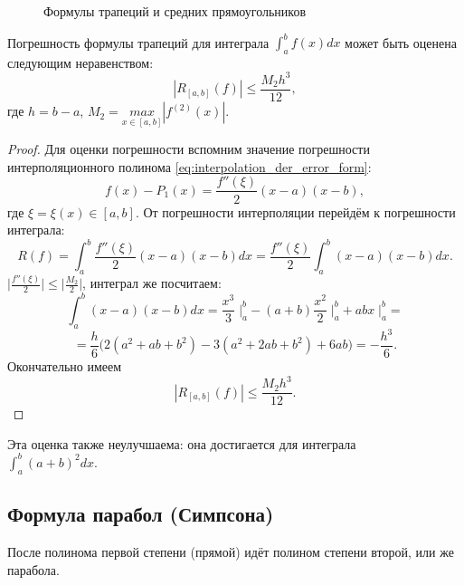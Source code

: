 \documentclass[../main.tex]{subfile}
\begin{document}
\begin{figure}[ht]
	\caption*{Формулы трапеций и средних прямоугольников}
\end{figure}

\begin{theorem}
\label{eq:trapezoidal_rule_error}
	Погрешность формулы трапеций для интеграла $\int_a^b f(x)dx$ может быть
	оценена следующим неравенством:
	\[\boxed{|R_{[a,b]}(f)|\le\frac{M_2h^3}{12}},\]
	где $h=b-a$, $M_2=\underset{x\in[a,b]}{max}|f^{(2)}(x)|.$
\end{theorem}

\begin{proof}
	Для оценки погрешности вспомним значение погрешности интерполяционного
	полинома \eqref{eq:interpolation_der_error_form}:
	\[f(x)-P_1(x)=\frac{f''(\xi)}{2}(x-a)(x-b),\]
	где $\xi=\xi(x)\in[a,b]$. От погрешности интерполяции перейдём к
	погрешности интеграла:
	\[R(f)=\int_a^b\frac{f''(\xi)}{2}(x-a)(x-b)dx=\frac{f''(\xi)}{2}\int_a^b
	(x-a)(x-b)dx.\]
	$\big|\frac{f''(\xi)}{2}\big|\le\big|\frac{M_2}{2}\big|$, интеграл же
	посчитаем:
	\[\int_a^b(x-a)(x-b)dx=\frac{x^3}{3}\;\Big|_a^b-(a+b)\frac{x^2}{2}\;
	\Big|_a^b+abx\;\Big|_a^b=\]
	\[=\frac{h}{6}\Big(2(a^2+ab+b^2)-3(a^2+2ab+b^2)+6ab\Big)=-\frac{h^3}{6}.
	\]
	Окончательно имеем
	\[|R_{[a,b]}(f)|\le\frac{M_2h^3}{12}.\]
\end{proof}

Эта оценка также неулучшаема: она достигается для интеграла\\
$\int_a^b (a+b)^2dx$.

\subsection{Формула парабол (Симпсона)}
После полинома первой степени (прямой) идёт полином степени второй, или же
парабола.
\end{document}
